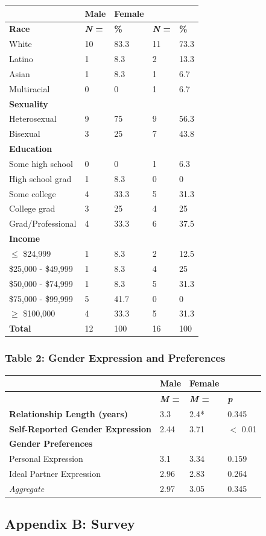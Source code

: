 \documentclass[twoside]{report}
\begin{document}
\begin{multicols*}{2}
\begin{longtable}[]{@{}lllll@{}}
\toprule
& \textbf{Male} & \textbf{Female} & &\tabularnewline
\midrule
\endhead
\textbf{Race} & \textbf{\emph{N} =} & \textbf{\%} & \textbf{\emph{N} =}
& \textbf{\%}\tabularnewline
White & 10 & 83.3 & 11 & 73.3\tabularnewline
Latino & 1 & 8.3 & 2 & 13.3\tabularnewline
Asian & 1 & 8.3 & 1 & 6.7\tabularnewline
Multiracial & 0 & 0 & 1 & 6.7\tabularnewline
\textbf{Sexuality} & & & &\tabularnewline
Heterosexual & 9 & 75 & 9 & 56.3\tabularnewline
Bisexual & 3 & 25 & 7 & 43.8\tabularnewline
\textbf{Education} & & & &\tabularnewline
Some high school & 0 & 0 & 1 & 6.3\tabularnewline
High school grad & 1 & 8.3 & 0 & 0\tabularnewline
Some college & 4 & 33.3 & 5 & 31.3\tabularnewline
College grad & 3 & 25 & 4 & 25\tabularnewline
Grad/Professional & 4 & 33.3 & 6 & 37.5\tabularnewline
\textbf{Income} & & & &\tabularnewline
$\leq$ \$24,999 & 1 & 8.3 & 2 & 12.5\tabularnewline
\$25,000 - \$49,999 & 1 & 8.3 & 4 & 25\tabularnewline
\$50,000 - \$74,999 & 1 & 8.3 & 5 & 31.3\tabularnewline
\$75,000 - \$99,999 & 5 & 41.7 & 0 & 0\tabularnewline
$\geq$ \$100,000 & 4 & 33.3 & 5 & 31.3\tabularnewline
\textbf{Total} & 12 & 100 & 16 & 100\tabularnewline
\bottomrule
\end{longtable}

\hypertarget{table-2}{\subsubsection[Table 2: Gender Expression \texorpdfstring{\\}{} and
Preferences]{Table 2: Gender Expression and
Preferences}}

\begin{longtable}[]{@{}llll@{}}
\toprule
& \textbf{Male} & \textbf{Female} &\tabularnewline
\midrule
\endhead
& \textbf{\emph{M} =} & \textbf{\emph{M} =~} &
\emph{\textbf{p}}\tabularnewline
\textbf{Relationship Length (years)} & 3.3 & 2.4* & 0.345\tabularnewline
\textbf{Self-Reported Gender Expression} & 2.44 & 3.71 & $<$ 0.01\tabularnewline
\textbf{Gender Preferences} & & &\tabularnewline
Personal Expression & 3.1 & 3.34 & 0.159\tabularnewline
Ideal Partner Expression & 2.96 & 2.83 & 0.264\tabularnewline
\emph{Aggregate} & 2.97 & 3.05 & 0.345\tabularnewline
\bottomrule
\end{longtable}

\newpage
\begin{multicols}{2}

\hypertarget{appendix-b}{\subsection{Appendix B: Survey}}


\end{multicols}
\end{multicols*}
\end{document}
